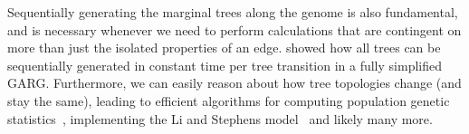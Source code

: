 \documentclass{article}
\begin{document}
Sequentially generating the marginal trees along the genome
is also fundamental, and is necessary whenever we need to
perform calculations that are contingent on more than just the
isolated properties of an edge. \cite{kelleher2016efficient}
showed how all trees can be sequentially generated in
constant time per tree transition in a fully simplified GARG.
Furthermore, we can easily reason about how tree topologies
change (and stay the same), leading to efficient algorithms
for computing population genetic
statistics~\citep{kelleher2016efficient,kelleher2018efficient},
implementing the Li and Stephens
model~\citep{kelleher2019inferring,wohns2022unified}
and likely many more.





\end{document}
